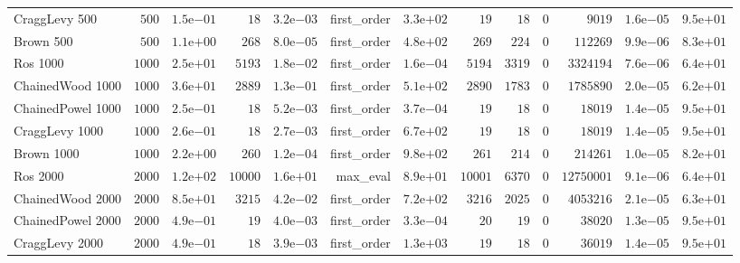 \begin{longtable}[c]{lrrrrrrrrrrrr}
CraggLevy 500 & \(  500\) & \( 1.5\)e\(-01\) & \(   18\) & \( 3.2\)e\(-03\) & first\_order & \( 3.3\)e\(+02\) & \(   19\) & \(   18\) & \(    0\) & \( 9019\) & \( 1.6\)e\(-05\) & \( 9.5\)e\(+01\) \\
Brown 500 & \(  500\) & \( 1.1\)e\(+00\) & \(  268\) & \( 8.0\)e\(-05\) & first\_order & \( 4.8\)e\(+02\) & \(  269\) & \(  224\) & \(    0\) & \(112269\) & \( 9.9\)e\(-06\) & \( 8.3\)e\(+01\) \\
Ros 1000 & \( 1000\) & \( 2.5\)e\(+01\) & \( 5193\) & \( 1.8\)e\(-02\) & first\_order & \( 1.6\)e\(-04\) & \( 5194\) & \( 3319\) & \(    0\) & \(3324194\) & \( 7.6\)e\(-06\) & \( 6.4\)e\(+01\) \\
ChainedWood 1000 & \( 1000\) & \( 3.6\)e\(+01\) & \( 2889\) & \( 1.3\)e\(-01\) & first\_order & \( 5.1\)e\(+02\) & \( 2890\) & \( 1783\) & \(    0\) & \(1785890\) & \( 2.0\)e\(-05\) & \( 6.2\)e\(+01\) \\
ChainedPowel 1000 & \( 1000\) & \( 2.5\)e\(-01\) & \(   18\) & \( 5.2\)e\(-03\) & first\_order & \( 3.7\)e\(-04\) & \(   19\) & \(   18\) & \(    0\) & \(18019\) & \( 1.4\)e\(-05\) & \( 9.5\)e\(+01\) \\
CraggLevy 1000 & \( 1000\) & \( 2.6\)e\(-01\) & \(   18\) & \( 2.7\)e\(-03\) & first\_order & \( 6.7\)e\(+02\) & \(   19\) & \(   18\) & \(    0\) & \(18019\) & \( 1.4\)e\(-05\) & \( 9.5\)e\(+01\) \\
Brown 1000 & \( 1000\) & \( 2.2\)e\(+00\) & \(  260\) & \( 1.2\)e\(-04\) & first\_order & \( 9.8\)e\(+02\) & \(  261\) & \(  214\) & \(    0\) & \(214261\) & \( 1.0\)e\(-05\) & \( 8.2\)e\(+01\) \\
Ros 2000 & \( 2000\) & \( 1.2\)e\(+02\) & \(10000\) & \( 1.6\)e\(+01\) & max\_eval & \( 8.9\)e\(+01\) & \(10001\) & \( 6370\) & \(    0\) & \(12750001\) & \( 9.1\)e\(-06\) & \( 6.4\)e\(+01\) \\
ChainedWood 2000 & \( 2000\) & \( 8.5\)e\(+01\) & \( 3215\) & \( 4.2\)e\(-02\) & first\_order & \( 7.2\)e\(+02\) & \( 3216\) & \( 2025\) & \(    0\) & \(4053216\) & \( 2.1\)e\(-05\) & \( 6.3\)e\(+01\) \\
ChainedPowel 2000 & \( 2000\) & \( 4.9\)e\(-01\) & \(   19\) & \( 4.0\)e\(-03\) & first\_order & \( 3.3\)e\(-04\) & \(   20\) & \(   19\) & \(    0\) & \(38020\) & \( 1.3\)e\(-05\) & \( 9.5\)e\(+01\) \\
CraggLevy 2000 & \( 2000\) & \( 4.9\)e\(-01\) & \(   18\) & \( 3.9\)e\(-03\) & first\_order & \( 1.3\)e\(+03\) & \(   19\) & \(   18\) & \(    0\) & \(36019\) & \( 1.4\)e\(-05\) & \( 9.5\)e\(+01\) \\

\end{longtable}
